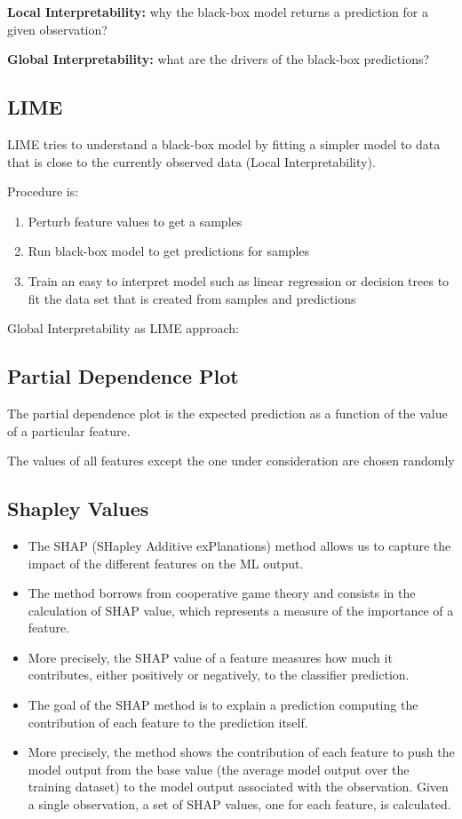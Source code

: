 \textbf{Local Interpretability:} why the black-box model returns a prediction for a given observation?

\textbf{Global Interpretability:} what are the drivers of the black-box predictions?

\subsection{LIME}

LIME tries to understand a black-box model by fitting a simpler model to data that is close to the currently observed data (Local Interpretability).

Procedure is:
\begin{enumerate}
    \item Perturb feature values to get a samples
    \item Run black-box model to get predictions for samples
    \item Train an easy to interpret model such as linear regression or decision trees to fit the data set that is created from samples and predictions
\end{enumerate}

Global Interpretability as LIME approach:
\subsection{Partial Dependence Plot}

The partial dependence plot is the expected prediction as a function of the value of a particular feature.

The values of all features except the one under consideration are chosen randomly 
\subsection{Shapley Values}
\begin{itemize}
    \item The SHAP (SHapley Additive exPlanations) method allows us to capture the impact of the different features on the ML output. 
    \item The method borrows from cooperative game theory and consists in the calculation of SHAP value, which represents a measure of the importance of a feature. 
    \item More precisely, the SHAP value of a feature measures how much it contributes, either positively or negatively, to the classifier prediction.
    \item The goal of the SHAP method is to explain a prediction computing the contribution of each feature to the prediction itself.
    \item More precisely, the method shows the contribution of each feature to push the model output from the base value (the average model output over the training dataset) to the model output associated with the observation. Given a single observation, a set of SHAP values, one for each feature, is calculated.
\end{itemize}

